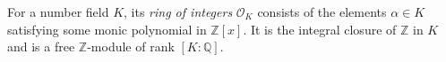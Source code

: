 
For a number field $K$, its \emph{ring of integers} $\mathcal O_K$ consists of the elements $\alpha\in K$ satisfying some monic polynomial in $\mathbb Z[x]$. It is the integral closure of $\mathbb Z$ in $K$ and is a free $\mathbb Z$-module of rank $[K:\mathbb Q]$.
